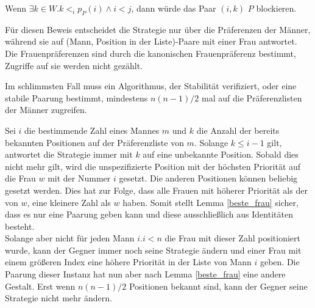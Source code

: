 \begin{Beweis}
\label{beste_frau_bew}
  Wenn $\exists k \in W.k <_{i}p_{P}(i)\land i < j$, dann würde das Paar $(i,k)$ $P$ blockieren.
\end{Beweis}

Für diesen Beweis entscheidet die Strategie nur über die Präferenzen der Männer, während sie auf (Mann, Position in der Liste)-Paare mit einer Frau antwortet. Die Frauenpräferenzen sind durch die kanonischen Frauenpräferenz bestimmt, Zugriffe auf sie werden nicht gezählt.

\begin{Theorem}
\label{keine_gute_loesung}
  Im schlimmsten Fall muss ein Algorithmus, der Stabilität verifiziert, oder eine stabile Paarung bestimmt, mindestens $n(n-1)/2$ mal auf die Präferenzlisten der Männer zugreifen.
\end{Theorem}

\begin{Beweis}
\label{keine_gute_loesung_bew}
  Sei $i$ die bestimmende Zahl eines Mannes $m$ und $k$ die Anzahl der bereits bekannten Positionen auf der Präferenzliste von $m$. Solange $k \leq i-1$ gilt, antwortet die Strategie immer mit $k$ auf eine unbekannte Position. Sobald dies nicht mehr gilt, wird die unspezifizierte Position mit der höchsten Priorität auf die Frau $w$ mit der Nummer $i$ gesetzt. Die anderen Positionen können beliebig gesetzt werden. Dies hat zur Folge, dass alle Frauen mit höherer Priorität als der von $w$, eine kleinere Zahl als $w$ haben. Somit stellt Lemma \ref{beste_frau} sicher, dass es nur eine Paarung geben kann und diese ausschließlich aus Identitäten besteht.\\
  Solange aber nicht für jeden Mann $i. i < n$ die Frau mit dieser Zahl positioniert wurde, kann der Gegner immer noch seine Strategie ändern und einer Frau mit einem größeren Index eine höhere Priorität in der Liste von Mann $i$ geben. Die Paarung dieser Instanz hat nun aber nach Lemma \ref{beste_frau} eine andere Gestalt. Erst wenn $n(n-1)/2$ Positionen bekannt sind, kann der Gegner seine Strategie nicht mehr ändern.

\end{Beweis}
